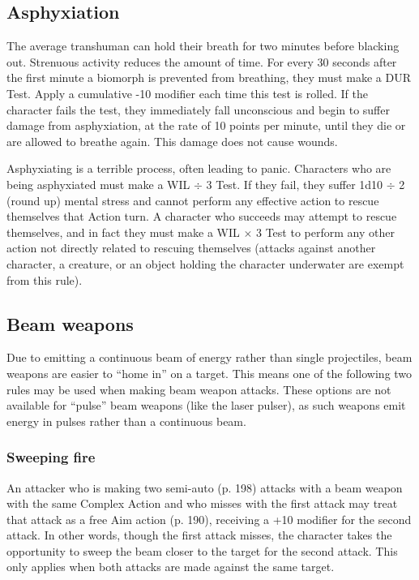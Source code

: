 \subsection{Asphyxiation} \label{sec:asphyxiation} 

The average transhuman can hold their breath for two minutes before blacking out. Strenuous activity reduces the amount of time. For every 30 seconds after the first minute a biomorph is prevented from breathing, they must make a DUR Test. Apply a cumulative -10 modifier each time this test is rolled. If the character fails the test, they immediately fall unconscious and begin to suffer damage from asphyxiation, at the rate of 10 points per minute, until they die or are allowed to breathe again. This damage does not cause wounds. 

Asphyxiating is a terrible process, often leading to panic. Characters who are being asphyxiated must make a WIL $\div$ 3 Test. If they fail, they suffer 1d10 $\div$ 2 (round up) mental stress and cannot perform any effective action to rescue themselves that Action turn. A character who succeeds may attempt to rescue themselves, and in fact they must make a WIL $\times$ 3 Test to perform any other action not directly related to rescuing themselves (attacks against another character, a creature, or an object holding the character underwater are exempt from this rule). 



\subsection{Beam weapons} \label{sec:combat-beam-weapons} 

Due to emitting a continuous beam of energy rather than single projectiles, beam weapons are easier to ``home in'' on a target. This means one of the following two rules may be used when making beam weapon attacks. These options are not available for ``pulse'' beam weapons (like the laser pulser), as such weapons emit energy in pulses rather than a continuous beam. 

\subsubsection{Sweeping fire} 

An attacker who is making two semi-auto (p. 198) attacks with a beam weapon with the same Complex Action and who misses with the first attack may treat that attack as a free Aim action (p. 190), receiving a +10 modifier for the second attack. In other words, though the first attack misses, the character takes the opportunity to sweep the beam closer to the target for the second attack. This only applies when both attacks are made against the same target. 

